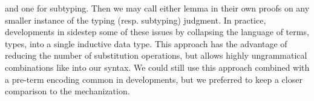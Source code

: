 and one for subtyping.
%
Then we may call either lemma in their own proofs on any
smaller instance of the typing (resp. subtyping) judgment.
%
In practice, developments in \coq sidestep some of these issues
by collapsing the language of terms, types, \etc 
into a single inductive data type. 
%
This approach has the advantage of reducing the number of substitution
operations, but allows highly ungrammatical
combinations like  into our syntax. 
%
We could still use this approach 
combined with a pre-term encoding common in \coq developments,  
but we preferred to keep a closer comparison to the \lh mechanization.
% 


